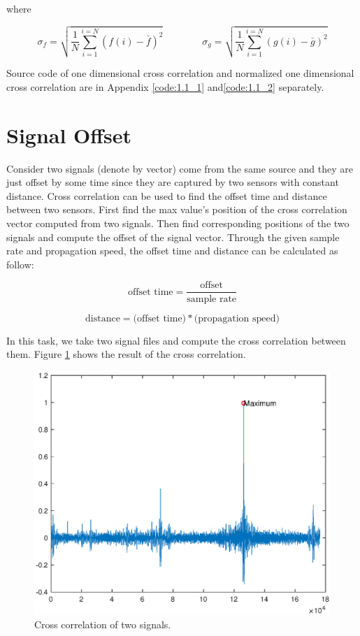 where

\begin{equation*}
{\sigma _{f}}=
\sqrt{\frac{1}{N}\sum_{i=1}^{i=N}(f(i)-\bar{f})^{2}}
\hspace{4em}
{\sigma _{g}}=
\sqrt{\frac{1}{N}\sum_{i=1}^{i=N}(g(i)-\bar{g})^{2}}
\end{equation*}

Source code of one dimensional cross correlation and normalized one dimensional cross correlation are in Appendix \ref{code:1.1_1} and\ref{code:1.1_2} separately.


\section{Signal Offset}

Consider two signals (denote by vector) come from the same source and they are just offset by some time since they are captured by two sensors with constant distance. Cross correlation can be used to find the offset time and distance between two sensors. First find the max value's position of the cross correlation vector computed from two signals. Then find corresponding positions of the two signals and compute the offset of the signal vector. Through the given sample rate and propagation speed, the offset time and distance can be calculated as follow:

\begin{equation*}
\text{offset time}=\frac{\text{offset}}{\text{sample rate}} 
\end{equation*}

\begin{equation*}
\text{distance}=\text{(offset time)} * \text{(propagation speed)}
\end{equation*}

In this task, we take two signal files and compute the cross correlation between them. Figure \ref{fig:crr_vis0} shows the result of the cross correlation. 

\begin{figure}[h!]
	\centering
		\includegraphics[width=0.45\linewidth]{figures/part1/crr_vis0.eps}
		\caption{Cross correlation of two signals.}
		\label{fig:crr_vis0}
\end{figure} 

